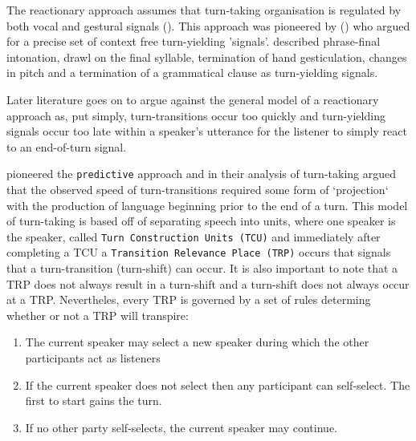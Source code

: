 \documentclass[logo,bsc,singlespacing,parskip]{infthesis}
\begin{document}
The reactionary approach assumes that turn-taking organisation is regulated by both vocal and gestural signals (\cite{Yngve1970}). This approach was pioneered by (\cite{Duncan1972, Duncan1973, Duncan1974, Duncan1977}) who argued for a precise set of context free turn-yielding 'signals'. \cite{Duncan1972} described phrase-final intonation, drawl on the final syllable, termination of hand gesticulation, changes in pitch and a termination of a grammatical clause as turn-yielding signals. 

Later literature goes on to argue against the general model of a reactionary approach as, put simply, turn-transitions occur too quickly and turn-yielding signals occur too late within a speaker's utterance for the listener to simply react to an end-of-turn signal. 

\cite{Sacks1974} pioneered the \texttt{predictive} approach and in their analysis of turn-taking argued that the observed speed of turn-transitions required some form of `projection` with the production of language beginning prior to the end of a turn. This model of turn-taking is based off of separating speech into units, where one speaker is the speaker, called \texttt{Turn Construction Units (TCU)} and immediately after completing a TCU a \texttt{Transition Relevance Place (TRP)} occurs that signals that a turn-transition (turn-shift) can occur. It is also important to note that a TRP does not always result in a turn-shift and a turn-shift does not always occur at a TRP. Nevertheles, every TRP is governed by a set of rules determing whether or not a TRP will transpire: 
\begin{enumerate}
    \item{} The current speaker may select a new speaker during which the other participants act as listeners 
    \item{} If the current speaker does not select then any participant can self-select. The first to start gains the turn.
    \item{} If no other party self-selects, the current speaker may continue. 
\end{enumerate} 
\end{document}
